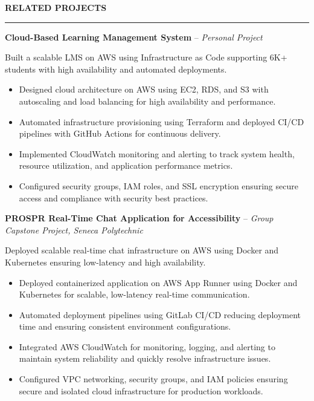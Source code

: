 \documentclass[10pt,letterpaper]{article}
\begin{document}
\vspace{6pt}

\textbf{RELATED PROJECTS}\\[-8pt]
\noindent\rule{\textwidth}{1pt}

\vspace{-2pt}

\textbf{Cloud-Based Learning Management System} -- \emph{Personal Project}

\vspace{-1pt}

Built a scalable LMS on AWS using Infrastructure as Code supporting 6K+ students with high availability and automated deployments.
\vspace{-1pt}
\begin{itemize}
\item Designed cloud architecture on AWS using EC2, RDS, and S3 with autoscaling and load balancing for high availability and performance.
\item Automated infrastructure provisioning using Terraform and deployed CI/CD pipelines with GitHub Actions for continuous delivery.
\item Implemented CloudWatch monitoring and alerting to track system health, resource utilization, and application performance metrics.
\item Configured security groups, IAM roles, and SSL encryption ensuring secure access and compliance with security best practices.
\end{itemize}

\textbf{PROSPR  Real-Time Chat Application for Accessibility} -- \emph{Group Capstone Project, Seneca Polytechnic}

\vspace{-1pt}

Deployed scalable real-time chat infrastructure on AWS using Docker and Kubernetes ensuring low-latency and high availability.
\vspace{-1pt}
\begin{itemize}
\item Deployed containerized application on AWS App Runner using Docker and Kubernetes for scalable, low-latency real-time communication.
\item Automated deployment pipelines using GitLab CI/CD reducing deployment time and ensuring consistent environment configurations.
\item Integrated AWS CloudWatch for monitoring, logging, and alerting to maintain system reliability and quickly resolve infrastructure issues.
\item Configured VPC networking, security groups, and IAM policies ensuring secure and isolated cloud infrastructure for production workloads.
\end{itemize}
\end{document}
